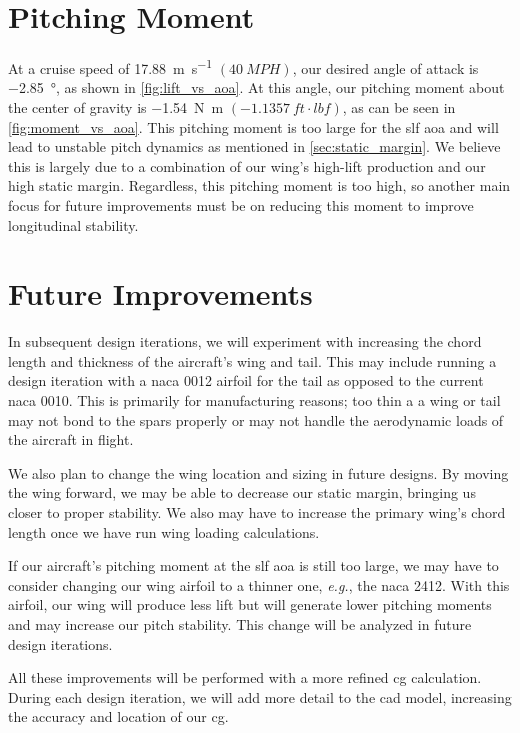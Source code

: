 \section{Pitching Moment}\label{sec:pitching_moment}

At a cruise speed of \qty{17.88}{\meter\per\second} $\left(\qty{40}{MPH}\right)$, our desired angle of attack is \qty{-2.85}{\degree}, as shown in \autoref{fig:lift_vs_aoa}. At this angle, our pitching moment about the center of gravity is \qty{-1.54}{\newton\meter} $\left(\qty{-1.1357}{ft\cdot lbf}\right)$, as can be seen in \autoref{fig:moment_vs_aoa}. This pitching moment is too large for the \acrshort{slf} \acrshort{aoa} and will lead to unstable pitch dynamics as mentioned in \autoref{sec:static_margin}. We believe this is largely due to a combination of our wing's high-lift production and our high static margin. Regardless, this pitching moment is too high, so another main focus for future improvements must be on reducing this moment to improve longitudinal stability.  

\section{Future Improvements}\label{sec:future_improvements}

In subsequent design iterations, we will experiment with increasing the chord length and thickness of the aircraft's wing and tail. This may include running a design iteration with a \acrshort{naca} 0012 airfoil for the tail as opposed to the current \acrshort{naca} 0010. This is primarily for manufacturing reasons; too thin a a wing or tail may not bond to the spars properly or may not handle the aerodynamic loads of the aircraft in flight.

We also plan to change the wing location and sizing in future designs. By moving the wing forward, we may be able to decrease our static margin, bringing us closer to proper stability. We also may have to increase the primary wing's chord length once we have run wing loading calculations.

If our aircraft's pitching moment at the \acrshort{slf} \acrshort{aoa} is still too large, we may have to consider changing our wing airfoil to a thinner one, \textit{e.g.}, the \acrshort{naca} 2412. With this airfoil, our wing will produce less lift but will generate lower pitching moments and may increase our pitch stability. This change will be analyzed in future design iterations.

All these improvements will be performed with a more refined \acrshort{cg} calculation. During each design iteration, we will add more detail to the \acrshort{cad} model, increasing the accuracy and location of our \acrshort{cg}.
